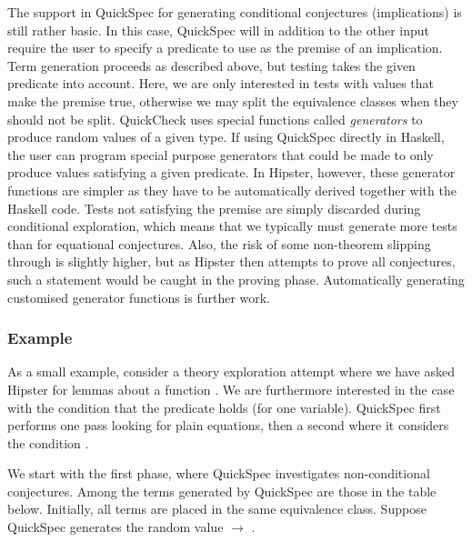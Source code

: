 The support in QuickSpec for generating conditional conjectures (implications) is still rather basic.
%
In this case, QuickSpec will in addition to the other input require the user to specify a predicate to use as the premise of an implication.
%
Term generation proceeds as described above, but testing takes the given predicate into account.
%
Here, we are only interested in tests with values that make the premise true, otherwise we may split the equivalence classes when they should not be split.
%
QuickCheck uses special functions called \emph{generators} to produce random values of a given type.
%
If using QuickSpec directly in Haskell, the user can program special purpose generators that could be made to only produce values satisfying a given predicate.
%
In Hipster, however, these generator functions are simpler as they have to be automatically derived together with the Haskell code.
%
Tests not satisfying the premise are simply discarded during conditional exploration, which means that we typically must generate more tests than for equational conjectures.
%
Also, the risk of some non-theorem slipping through is slightly higher, but as Hipster then attempts to prove all conjectures, such a statement would be caught in the proving phase.
%
Automatically generating customised generator functions is further work. 

\subsubsection*{Example}
As a small example, consider a theory exploration attempt where we have asked Hipster for lemmas about a function .
%
We are furthermore interested in the case with the condition that the predicate  holds (for one variable). %
QuickSpec first performs one pass looking for plain equations, then a second where it considers the condition . 

We start with the first phase, where QuickSpec investigates non-conditional conjectures.
%
Among the terms generated by QuickSpec are those in the table below.
%
Initially, all terms are placed in the same equivalence class.
%
Suppose QuickSpec generates the random value  $\rightarrow$ \isaCode{[3,1]}.     

